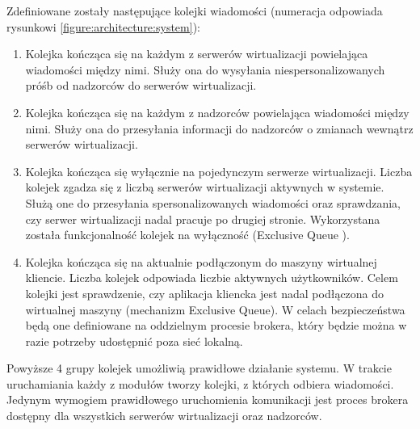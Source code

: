 \documentclass[../opis-rozwiazania.tex]{subfiles}
\begin{document}
Zdefiniowane zostały następujące kolejki wiadomości (numeracja odpowiada rysunkowi \ref{figure:architecture:system}):
\begin{enumerate}[label=(\Roman*)]
  \item \label{modules:broker:queue-virtsrv} Kolejka kończąca się na każdym z serwerów wirtualizacji powielająca wiadomości między nimi.
        Służy ona do wysyłania niespersonalizowanych próśb od nadzorców do serwerów wirtualizacji.
  \item \label{modules:broker:queue-overseers} Kolejka kończąca się na każdym z nadzorców powielająca wiadomości między nimi.
        Służy ona do przesyłania informacji do nadzorców o zmianach wewnątrz serwerów wirtualizacji.
  \item \label{modules:broker:queue-exclusive} Kolejka kończąca się wyłącznie na pojedynczym serwerze wirtualizacji.
        Liczba kolejek zgadza się z liczbą serwerów wirtualizacji aktywnych w systemie.
        Służą one do przesyłania spersonalizowanych wiadomości oraz sprawdzania, czy serwer wirtualizacji nadal pracuje po drugiej stronie.
        Wykorzystana została funkcjonalność kolejek na wyłączność (Exclusive Queue \parencite{xrdp-clients}).
  \item \label{modules:broker:queue-users} Kolejka kończąca się na aktualnie podłączonym do maszyny wirtualnej kliencie.
        Liczba kolejek odpowiada liczbie aktywnych użytkowników.
        Celem kolejki jest sprawdzenie, czy aplikacja kliencka jest nadal podłączona do wirtualnej maszyny (mechanizm Exclusive Queue).
        W celach bezpieczeństwa będą one definiowane na oddzielnym procesie brokera, który będzie można w razie potrzeby udostępnić poza sieć lokalną.
\end{enumerate}

Powyższe 4 grupy kolejek umożliwią prawidłowe działanie systemu.
W trakcie uruchamiania każdy z modułów tworzy kolejki, z których odbiera wiadomości.
Jedynym wymogiem prawidłowego uruchomienia komunikacji jest proces brokera dostępny dla wszystkich serwerów wirtualizacji oraz nadzorców.
\end{document}
